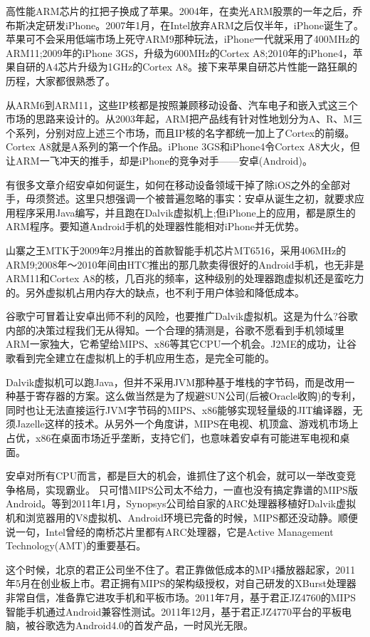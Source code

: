 \documentclass[utf8]{book}
\begin{document}
	高性能ARM芯片的扛把子换成了苹果。2004年，在卖光ARM股票的一年之后，乔布斯决定研发iPhone。2007年1月，在Intel放弃ARM之后仅半年，iPhone诞生了。苹果可不会采用低端市场上死守ARM9那种玩法，iPhone一代就采用了400MHz的ARM11;2009年的iPhone 3GS，升级为600MHz的Cortex A8;2010年的iPhone4，苹果自研的A4芯片升级为1GHz的Cortex A8。接下来苹果自研芯片性能一路狂飙的历程，大家都很熟悉了。
	
	从ARM6到ARM11，这些IP核都是按照兼顾移动设备、汽车电子和嵌入式这三个市场的思路来设计的。从2003年起，ARM把产品线有针对性地划分为A、R、M三个系列，分别对应上述三个市场，而且IP核的名字都统一加上了Cortex的前缀。Cortex A8就是A系列的第一个作品。iPhone 3GS和iPhone4令Cortex A8大火，但让ARM一飞冲天的推手，却是iPhone的竞争对手——安卓(Android)。
	
	有很多文章介绍安卓如何诞生，如何在移动设备领域干掉了除iOS之外的全部对手，毋须赘述。这里只想强调一个被普遍忽略的事实：安卓从诞生之初，就要求应用程序采用Java编写，并且跑在Dalvik虚拟机上;但iPhone上的应用，都是原生的ARM程序。要知道Android手机的处理器性能相对iPhone并无优势。
	
	山寨之王MTK于2009年2月推出的首款智能手机芯片MT6516，采用406MHz的ARM9;2008年～2010年间由HTC推出的那几款卖得很好的Android手机，也无非是ARM11和Cortex A8的核，几百兆的频率，这种级别的处理器跑虚拟机还是蛮吃力的。另外虚拟机占用内存大的缺点，也不利于用户体验和降低成本。
	
	谷歌宁可冒着让安卓出师不利的风险，也要推广Dalvik虚拟机。这是为什么?谷歌内部的决策过程我们无从得知。一个合理的猜测是，谷歌不愿看到手机领域里ARM一家独大，它希望给MIPS、x86等其它CPU一个机会。J2ME的成功，让谷歌看到完全建立在虚拟机上的手机应用生态，是完全可能的。
	
	Dalvik虚拟机可以跑Java，但并不采用JVM那种基于堆栈的字节码，而是改用一种基于寄存器的方案。这么做当然是为了规避SUN公司(后被Oracle收购)的专利，同时也让无法直接运行JVM字节码的MIPS、x86能够实现轻量级的JIT编译器，无须Jazelle这样的技术。从另外一个角度讲，MIPS在电视、机顶盒、游戏机市场上占优，x86在桌面市场近乎垄断，支持它们，也意味着安卓有可能进军电视和桌面。
	
	安卓对所有CPU而言，都是巨大的机会，谁抓住了这个机会，就可以一举改变竞争格局，实现霸业。
	只可惜MIPS公司太不给力，一直也没有搞定靠谱的MIPS版Android。等到2011年1月，Synopsys公司给自家的ARC处理器移植好Dalvik虚拟机和浏览器用的V8虚拟机、Android环境已完备的时候，MIPS都还没动静。顺便说一句，Intel曾经的南桥芯片里都有ARC处理器，它是Active Management Technology(AMT)的重要基石。
	
	这个时候，北京的君正公司坐不住了。君正靠做低成本的MP4播放器起家，2011年5月在创业板上市。君正拥有MIPS的架构级授权，对自己研发的XBurst处理器非常自信，准备靠它进攻手机和平板市场。2011年7月，基于君正JZ4760的MIPS智能手机通过Android兼容性测试。2011年12月，基于君正JZ4770平台的平板电脑，被谷歌选为Android4.0的首发产品，一时风光无限。
	
\end{document}
